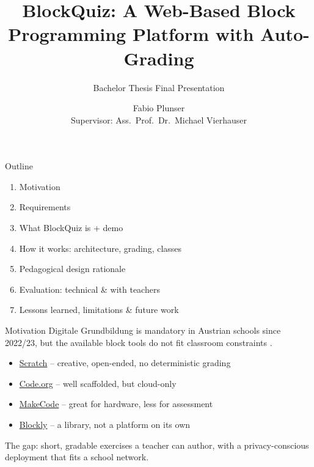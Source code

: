 \documentclass[11pt,t,usepdftitle=false,aspectratio=169]{beamer}
\title{BlockQuiz: A Web-Based Block Programming Platform with Auto-Grading}
\subtitle{Bachelor Thesis Final Presentation}
\author[]{\small Fabio Plunser \\ {\footnotesize Supervisor: Ass.\ Prof.\ Dr.\ Michael Vierhauser}}
\begin{document}
\maketitle

\begin{frame}{Outline}
  \begin{enumerate}
    \item Motivation
    \item Requirements
    \item What BlockQuiz is + demo
    \item How it works: architecture, grading, classes
    \item Pedagogical design rationale
    \item Evaluation: technical \& with teachers
    \item Lessons learned, limitations \& future work
  \end{enumerate}
\end{frame}

\begin{frame}{Motivation}
  Digitale Grundbildung is mandatory in Austrian schools since 2022/23,
  but the available block tools do not fit classroom constraints \cite{digitaleGrunbildung}.
  \begin{itemize}
    \item \href{https://scratch.mit.edu/}{Scratch} -- creative, open-ended, no deterministic grading
    \item \href{https://code.org/}{Code.org} -- well scaffolded, but cloud-only
    \item \href{https://www.microsoft.com/en-us/education/MakeCode}{MakeCode} -- great for hardware, less for assessment
    \item \href{https://developers.google.com/blockly/}{Blockly} -- a library, not a platform on its own
  \end{itemize}
  The gap: short, gradable exercises a teacher can author, with a
  privacy-conscious deployment that fits a school network.
\end{frame}
\end{document}
